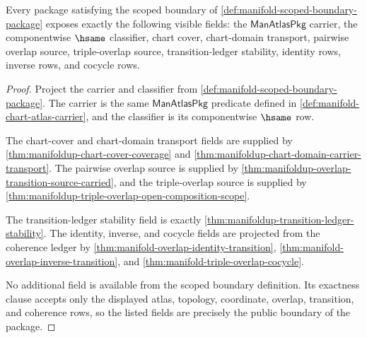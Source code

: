 \begin{theorem}
\label{thm:manifold-scoped-field-coverage}
Every package satisfying the scoped boundary of
\autoref{def:manifold-scoped-boundary-package} exposes exactly the following
visible fields: the $\mathsf{ManAtlasPkg}$ carrier, the componentwise
$\hsame$ classifier, chart cover, chart-domain transport, pairwise overlap
source, triple-overlap source, transition-ledger stability, identity rows,
inverse rows, and cocycle rows.
\end{theorem}
\begin{proof}
Project the carrier and classifier from
\autoref{def:manifold-scoped-boundary-package}. The carrier is the same
$\mathsf{ManAtlasPkg}$ predicate defined in
\autoref{def:manifold-chart-atlas-carrier}, and the classifier is its
componentwise $\hsame$ row.

The chart-cover and chart-domain transport fields are supplied by
\autoref{thm:manifoldup-chart-cover-coverage} and
\autoref{thm:manifoldup-chart-domain-carrier-transport}. The pairwise overlap
source is supplied by
\autoref{thm:manifoldup-overlap-transition-source-carried}, and the
triple-overlap source is supplied by
\autoref{thm:manifoldup-triple-overlap-open-composition-scope}.

The transition-ledger stability field is exactly
\autoref{thm:manifoldup-transition-ledger-stability}. The identity, inverse,
and cocycle fields are projected from the coherence ledger by
\autoref{thm:manifold-overlap-identity-transition},
\autoref{thm:manifold-overlap-inverse-transition}, and
\autoref{thm:manifold-triple-overlap-cocycle}.

No additional field is available from the scoped boundary definition. Its
exactness clause accepts only the displayed atlas, topology, coordinate,
overlap, transition, and coherence rows, so the listed fields are precisely
the public boundary of the package.
\end{proof}

